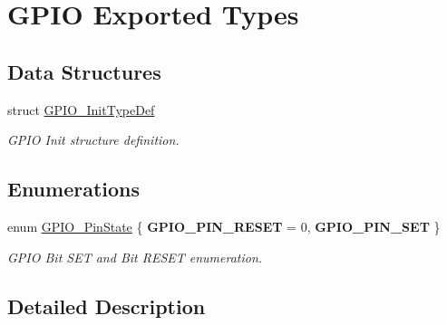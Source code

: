 \hypertarget{group___g_p_i_o___exported___types}{}\section{G\+P\+IO Exported Types}
\label{group___g_p_i_o___exported___types}
\subsection*{Data Structures}
\begin{DoxyCompactItemize}
\item 
struct \hyperlink{struct_g_p_i_o___init_type_def}{G\+P\+I\+O\+\_\+\+Init\+Type\+Def}
\begin{DoxyCompactList}\small\item\em G\+P\+IO Init structure definition. \end{DoxyCompactList}\end{DoxyCompactItemize}
\subsection*{Enumerations}
\begin{DoxyCompactItemize}
\item 
\mbox{\label{group___g_p_i_o___exported___types_ga5b3ef0486b179415581eb342e0ea6b43}} 
enum \hyperlink{group___g_p_i_o___exported___types_ga5b3ef0486b179415581eb342e0ea6b43}{G\+P\+I\+O\+\_\+\+Pin\+State} \{ {\bfseries G\+P\+I\+O\+\_\+\+P\+I\+N\+\_\+\+R\+E\+S\+ET} = 0, 
{\bfseries G\+P\+I\+O\+\_\+\+P\+I\+N\+\_\+\+S\+ET}
 \}\begin{DoxyCompactList}\small\item\em G\+P\+IO Bit S\+ET and Bit R\+E\+S\+ET enumeration. \end{DoxyCompactList}
\end{DoxyCompactItemize}


\subsection{Detailed Description}
